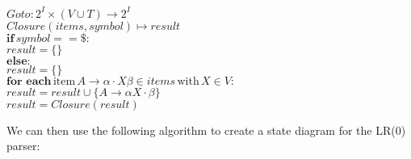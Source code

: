 \documentclass{article}
\begin{document}
	$\textit{Goto}: 2^I \times (V \cup T) \rightarrow 2^I$\\
	$\textit{Closure}(\textit{items}, \textit{symbol}) \mapsto \textit{result}$\\
	\-\hspace{1em} $\textbf{if} \, \textit{symbol} == \$ \textrm{:}$\\
	\-\hspace{2em} $\textit{result} = \{\}$\\
	\-\hspace{1em} $\textbf{else} \textrm{:}$\\
	\-\hspace{2em} $\textit{result} = \{\}$\\
	\-\hspace{2em} $\textbf{for each} \, \textrm{item} \, A \rightarrow \alpha \cdot X \beta \in \textit{items} \, \textrm{with} \, X \in V \textrm{:}$\\
	\-\hspace{3em} $\textit{result} = \textit{result} \cup \{A \rightarrow \alpha X \cdot \beta\}$\\
	\-\hspace{2em} $\textit{result} = \textit{Closure}(\textit{result})$
	
	\pagebreak
	
	We can then use the following algorithm to create a state diagram for the LR(0) parser:
	
\end{document}

